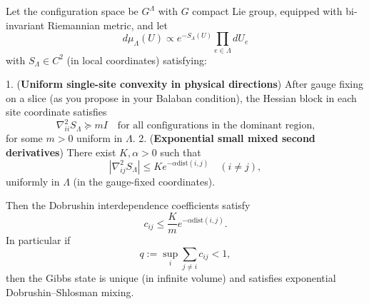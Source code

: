 \begin{theorem}
\label{thm:balaban-convexity}
\label{lem:rg-convexity}
\label{thm:stability-mixing}
Let the configuration space be $G^\Lambda$ with $G$ compact Lie group, equipped with bi-invariant Riemannian metric, and let
\[
d\mu_\Lambda(U) \propto e^{-S_\Lambda(U)} \prod_{e\in\Lambda} dU_e
\]
with $S_\Lambda\in C^2$ (in local coordinates) satisfying:

1. (\textbf{Uniform single-site convexity in physical directions}) After gauge fixing on a slice (as you propose in your Balaban condition), the Hessian block in each site coordinate satisfies
   \[
   \nabla^2_{i i} S_\Lambda \succeq m I
   \quad\text{for all configurations in the dominant region,}
   \]
   for some $m>0$ uniform in $\Lambda$.
2. (\textbf{Exponential small mixed second derivatives}) There exist $K,\alpha>0$ such that
   \[
   |\nabla^2_{i j} S_\Lambda| \le K e^{-\alpha\mathrm{dist}(i,j)} \quad(i\ne j),
   \]
   uniformly in $\Lambda$ (in the gauge-fixed coordinates).

Then the Dobrushin interdependence coefficients satisfy
\[
c_{ij} \le \frac{K}{m}e^{-\alpha\mathrm{dist}(i,j)}.
\]
In particular if
\[
q := \sup_i \sum_{j\ne i} c_{ij} < 1,
\]
then the Gibbs state is unique (in infinite volume) and satisfies exponential Dobrushin--Shlosman mixing.
\end{theorem}

